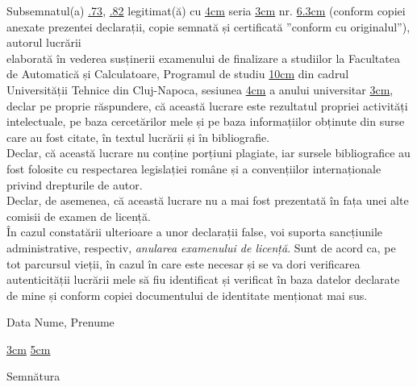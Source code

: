 \begin{minipage}{\linewidth}
	Subsemnatul(a) \uline{.73\linewidth},
	\uline{.82\linewidth}
	legitimat(ă) cu 	\uline{4cm} seria \uline{3cm} nr. \uline{6.3cm}
	(conform copiei anexate prezentei declarații, copie semnată și certificată ”conform cu originalul”), autorul lucrării\\
	\uline{\linewidth}
	\uline{\linewidth}
	\uline{\linewidth}
	elaborată în vederea susținerii examenului de finalizare a studiilor la Facultatea de Automatică și Calculatoare, Programul de studiu \uline{10cm} din cadrul Universității Tehnice din Cluj-Napoca, sesiunea \uline{4cm} a anului universitar \uline{3cm}, declar pe proprie răspundere, că această lucrare este rezultatul propriei activități intelectuale, pe baza cercetărilor mele și pe baza informațiilor obținute din surse care au fost citate, în textul lucrării și în bibliografie.\\
	Declar, că această lucrare nu conține porțiuni plagiate, iar sursele bibliografice au fost folosite cu respectarea legislației române și a convențiilor internaționale privind drepturile de autor.\\
	Declar, de asemenea, că această lucrare nu a mai fost prezentată în fața unei alte comisii de examen de licență.\\
	În cazul constatării ulterioare a unor declarații false, voi suporta sancțiunile administrative, respectiv, \emph{anularea examenului de licență}.
	Sunt de acord ca, pe tot parcursul vieții, în cazul în care este necesar și se va dori verificarea autenticității lucrării mele să fiu identificat și verificat în baza datelor declarate de mine și conform copiei documentului de identitate menționat mai sus.
\end{minipage}
\vspace{1.5cm}

Data \hspace{8cm} Nume, Prenume

\vspace{0.5cm}

\uline{3cm} \hspace{5cm} \uline{5cm}

\vspace{1cm}
\hspace{9.4cm}Semnătura
\newpage
